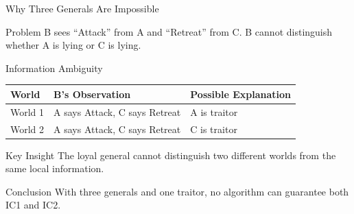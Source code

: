 \documentclass[aspectratio=169]{beamer}
\begin{document}
\begin{frame}{Why Three Generals Are Impossible}

\begin{center}
\end{center}

\begin{alertblock}{Problem}
B sees ``Attack'' from A and ``Retreat'' from C.  
B cannot distinguish whether A is lying or C is lying.
\end{alertblock}

\end{frame}

\begin{frame}{Information Ambiguity}

\begin{table}
\centering
\begin{tabular}{lll}
\toprule
World & B's Observation & Possible Explanation \\
\midrule
World 1 & A says Attack, C says Retreat & A is traitor \\
World 2 & A says Attack, C says Retreat & C is traitor \\
\bottomrule
\end{tabular}
\end{table}

\vspace{0.4cm}

\begin{block}{Key Insight}
The loyal general cannot distinguish two different worlds from the same local information.
\end{block}

\begin{alertblock}{Conclusion}
With three generals and one traitor, no algorithm can guarantee both IC1 and IC2.
\end{alertblock}

\end{frame}
\end{document}
